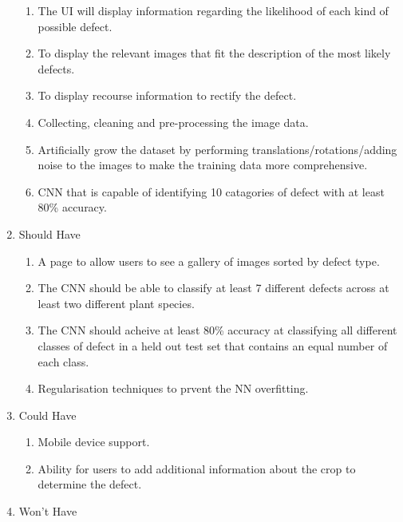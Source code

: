 \begin{enumerate}
\begin{enumerate}
  	\item The UI will display information regarding the likelihood of each kind of possible defect.
  	\item To display the relevant images that fit the description of the most likely defects.
  	\item To display recourse information to rectify the defect.
  	\item Collecting, cleaning and pre-processing the image data.
    \item Artificially grow the dataset by performing translations/rotations/adding noise to the images to make the training data more comprehensive.
    \item CNN that is capable of identifying 10 catagories of defect with at least 80\% accuracy.
  \end{enumerate}
  \item Should Have
  \begin{enumerate}
    \item A page to allow users to see a gallery of images sorted by
      defect type.
    \item The CNN should be able to classify at least 7 different defects across at least two different plant species.
    \item The CNN should acheive at least 80\% accuracy at classifying all different classes of defect in a held out test set that contains an equal number of each class.
  	\item Regularisation techniques to prvent the NN overfitting.
  \end{enumerate}
  \item Could Have
  \begin{enumerate}
      \item Mobile device support.
    \item Ability for users to add additional information about the crop
      to determine the defect.
  \end{enumerate}
  \item Won't Have
\end{enumerate}


